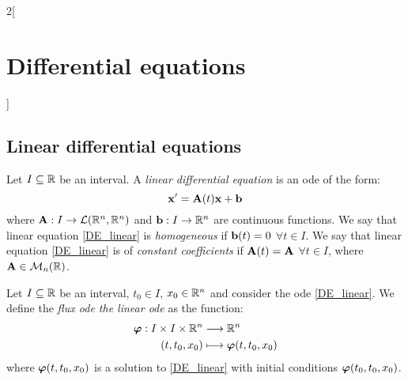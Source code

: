 \documentclass[../../../main.tex]{subfiles}
\begin{document}
\begin{multicols}{2}[\section{Differential equations}]
  \subsection{Linear differential equations}
  \begin{definition}
    Let $I\subseteq\mathbb{R}$ be an interval. A \textit{linear differential equation} is an ode of the form:
    \begin{equation}\label{DE_linear}
      \boldsymbol{\mathrm{x}}'=\boldsymbol{\mathrm{A}}(t)\boldsymbol{\mathrm{x}}+\boldsymbol{\mathrm{b}}
    \end{equation}
    where $\boldsymbol{\mathrm{A}}:I\rightarrow\mathcal{L}(\mathbb{R}^n,\mathbb{R}^n)$ and $\boldsymbol{\mathrm{b}}:I\rightarrow\mathbb{R}^n$ are continuous functions.
    We say that linear equation \eqref{DE_linear} is \textit{homogeneous} if $\boldsymbol{\mathrm{b}}(t)=0$ $\forall t\in I$. We say that linear equation \eqref{DE_linear} is of \textit{constant coefficients} if $\boldsymbol{\mathrm{A}}(t)=\boldsymbol{\mathrm{A}}$ $\forall t\in I$, where $\boldsymbol{\mathrm{A}}\in\mathcal{M}_n(\mathbb{R})$.
  \end{definition}
  \begin{definition}
    Let $I\subseteq\mathbb{R}$ be an interval, $t_0\in I$, $x_0\in\mathbb{R}^n$ and consider the ode \eqref{DE_linear}. We define the \textit{flux ode the linear ode} as the function:
    \begin{align*}
      \boldsymbol{\mathrm{\varphi}}:I\times I\times \mathbb{R}^n & \longrightarrow\mathbb{R}^n                           \\
      (t,t_0,x_0)                                    & \longmapsto\boldsymbol{\mathrm{\varphi}}(t,t_0,x_0)
    \end{align*}
    where $\boldsymbol{\mathrm{\varphi}}(t,t_0,x_0)$ is a solution to \eqref{DE_linear} with initial conditions $\boldsymbol{\mathrm{\varphi}}(t_0,t_0,x_0)$.
  \end{definition}

\end{multicols}
\end{document}

